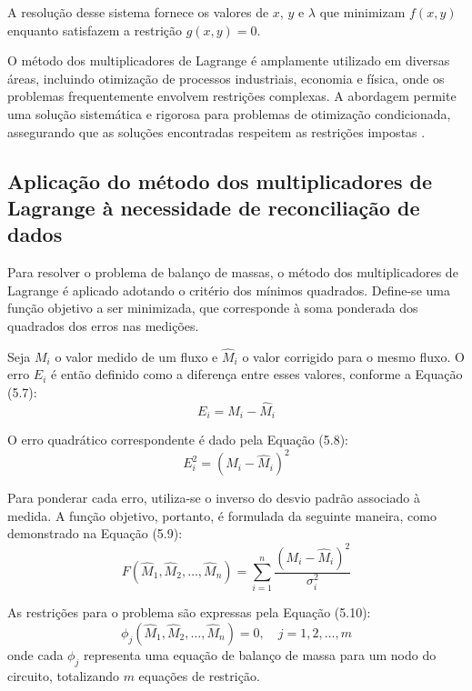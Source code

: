 A resolução desse sistema fornece os valores de $x$, $y$ e $\lambda$ que minimizam $f(x, y)$ enquanto satisfazem a restrição $g(x, y) = 0$.

O método dos multiplicadores de Lagrange é amplamente utilizado em diversas áreas, incluindo otimização de processos industriais, economia e física, onde os problemas frequentemente envolvem restrições complexas. A abordagem permite uma solução sistemática e rigorosa para problemas de otimização condicionada, assegurando que as soluções encontradas respeitem as restrições impostas \cite{lagrangeoptbook}.


\subsection{Aplicação do método dos multiplicadores de Lagrange à necessidade de reconciliação de dados}

Para resolver o problema de balanço de massas, o método dos multiplicadores de Lagrange é aplicado adotando o critério dos mínimos quadrados. Define-se uma função objetivo a ser minimizada, que corresponde à soma ponderada dos quadrados dos erros nas medições.

Seja $M_i$ o valor medido de um fluxo e $\hat{M}_i$ o valor corrigido para o mesmo fluxo. O erro $E_i$ é então definido como a diferença entre esses valores, conforme a Equação (5.7):
\begin{equation}
	E_i = M_i - \hat{M}_i
\end{equation}

O erro quadrático correspondente é dado pela Equação (5.8):
\begin{equation}
	E_i^2 = (M_i - \hat{M}_i)^2
\end{equation}

Para ponderar cada erro, utiliza-se o inverso do desvio padrão associado à medida. A função objetivo, portanto, é formulada da seguinte maneira, como demonstrado na Equação (5.9):
\begin{equation}
	F(\hat{M}_1, \hat{M}_2, \dots, \hat{M}_n) = \sum_{i=1}^n \frac{(M_i - \hat{M}_i)^2}{\sigma_i^2}
\end{equation}

As restrições para o problema são expressas pela Equação (5.10):
\begin{equation}
	\phi_j(\hat{M}_1, \hat{M}_2, \dots, \hat{M}_n) = 0, \quad j = 1, 2, \dots, m
\end{equation}
onde cada $\phi_j$ representa uma equação de balanço de massa para um nodo do circuito, totalizando $m$ equações de restrição.

